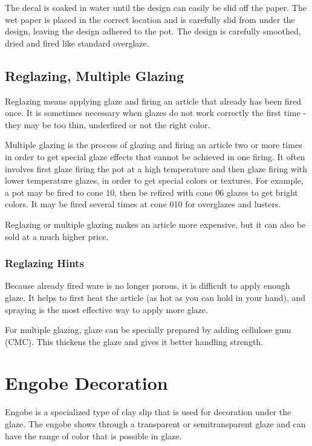 The decal is soaked in water until the design can easily be slid off the paper. 
The wet paper is placed in the correct location and is carefully slid from 
under the design, leaving the design adhered to the pot. The design is 
carefully smoothed, dried and fired like standard overglaze.
\subsection{Reglazing, Multiple Glazing}
Reglazing means applying glaze and firing an article that already has been 
fired once. It is sometimes necessary when glazes do not work correctly the 
first time -they may be too thin, underfired or not the right color.

Multiple glazing is the process of glazing and firing an article two or more 
times in order to get special glaze effects that cannot be achieved in one 
firing. It often involves first glaze firing the pot at a high temperature and 
then glaze firing with lower temperature glazes, in order to get special colors 
or textures. For example, a pot may be fired to cone 10, then be refired with 
cone 06 glazes to get bright colors. It may be fired several times at cone 010 
for overglazes and lusters.

Reglazing or multiple glazing makes an article more expensive, but it can also 
be sold at a much higher price.
\subsubsection{Reglazing Hints}

Because already fired ware is no longer porous, it is difficult to apply enough 
glaze. It helps to first heat the article (as hot as you can hold in your 
hand), and spraying is the most effective way to apply more glaze.

For multiple glazing, glaze can be specially prepared by adding cellulose gum 
(CMC). This thickens the glaze and gives it better handling strength.
\section{Engobe Decoration}
Engobe is a specialized type of clay slip that is used for decoration under the 
glaze. The engobe shows through a transparent or semitransparent glaze and can 
have the range of color that is possible in glaze.
